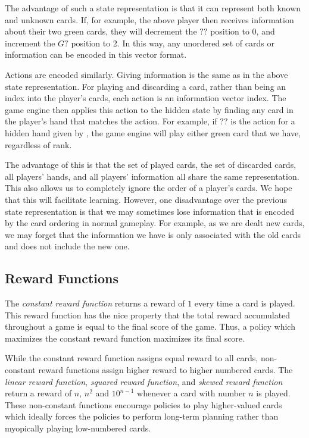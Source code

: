 The advantage of such a state representation is that it can represent both
known and unknown cards. If, for example, the above player then receives
information about their two green cards, they will decrement the $??$ position
to 0, and increment the $G?$ position to 2. In this way, any unordered set of
cards or information can be encoded in this vector format.

Actions are encoded similarly. Giving information is the same as in the above
state representation. For playing and discarding a card, rather than being an
index into the player's cards, each action is an information vector index.  The
game engine then applies this action to the hidden state by finding any card in
the player's hand that matches the action.  For example, if $??$ is the action
for a hidden hand given by , the game engine will play
either green card that we have, regardless of rank.

The advantage of this is that the set of played cards, the set of
discarded cards, all players' hands, and all players' information all share the
same representation. This also allows us to completely ignore the order of a
player's cards. We hope that this will facilitate learning. However, one
disadvantage over the previous state representation is that we may sometimes
lose information that is encoded by the card ordering in normal gameplay. For
example, as we are dealt new cards, we may forget that the information we have
is only associated with the old cards and does not include the new one.

\subsection{Reward Functions}
The \emph{constant reward function} returns a reward of $1$ every time a card
is played. This reward function has the nice property that the total reward
accumulated throughout a game is equal to the final score of the game. Thus, a
policy which maximizes the constant reward function maximizes its final score.

While the constant reward function assigns equal reward to all cards,
non-constant reward functions assign higher reward to higher numbered cards.
The \emph{linear reward function}, \emph{squared reward function}, and
\emph{skewed reward function} return a reward of $n$, $n^2$ and $10^{n-1}$
whenever a card with number $n$ is played. These non-constant functions
encourage policies to play higher-valued cards which ideally forces the
policies to perform long-term planning rather than myopically playing
low-numbered cards.

